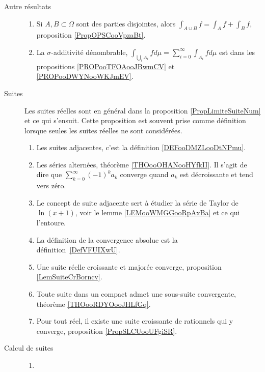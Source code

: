 \begin{description}
\item[Autre résultats]
\begin{enumerate}
    \item
        Si \( A,B\subset \Omega\) sont des parties disjointes, alors $\int_{A\cup B}f=\int_Af+\int_Bf$, proposition \ref{PropOPSCooVpzaBt}.
    \item
        La \( \sigma\)-additivité dénombrable, $\int_{\bigcup_iA_i}fd\mu=\sum_{i=0}^{\infty}\int_{A_i}fd\mu$ est dans les propositions \ref{PROPooTFOAooJBwmCV} et \ref{PROPooDWYNooWKJmEV}.
\end{enumerate}
\end{description}



\begin{description}
    \item[Suites] 
        Les suites réelles sont en général dans la proposition \ref{PropLimiteSuiteNum} et ce qui s'ensuit. Cette proposition est souvent prise comme définition lorsque seules les suites réelles ne sont considérées.
        \begin{enumerate}
    \item
        Les suites adjacentes, c'est la définition \ref{DEFooDMZLooDtNPmu}. 
    \item
        Les séries alternées, théorème \ref{THOooOHANooHYfkII}. Il s'agit de dire que \( \sum_{k=0}^{\infty}(-1)^ka_k\) converge quand \( a_k\) est décroissante et tend vers zéro.
    \item
        Le concept de suite adjacente sert à étudier la série de Taylor de \( \ln(x+1)\), voir le lemme \ref{LEMooWMGGooRpAxBa} et ce qui l'entoure.
    \item
        La définition de la convergence absolue est la définition~\ref{DefVFUIXwU}.
            \item
                Une suite réelle croissante et majorée converge, proposition \ref{LemSuiteCrBorncv}.
            \item
                Toute suite dans un compact admet une sous-suite convergente, théorème \ref{THOooRDYOooJHLfGq}.
            \item
                Pour tout réel, il existe une suite croissante de rationnels qui y converge, proposition \ref{PropSLCUooUFgiSR}.
        \end{enumerate}
    \item[Calcul de suites]
        \begin{enumerate}
            \item

\end{enumerate}
\end{description}

